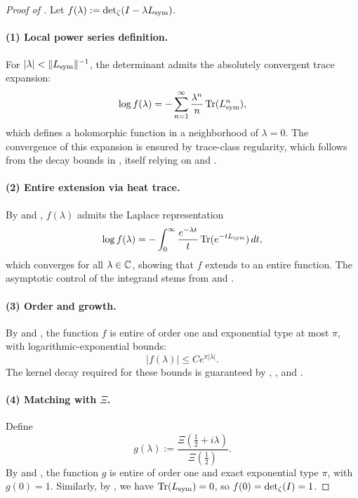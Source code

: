 \begin{proof}[Proof of ]
Let \( f(\lambda) := \det\nolimits_{\zeta}(I - \lambda L_{\mathrm{sym}}) \).

\paragraph{(1) Local power series definition.}
For \( |\lambda| < \|L_{\mathrm{sym}}\|^{-1} \), the determinant admits the absolutely convergent trace expansion:
\[
\log f(\lambda) = - \sum_{n=1}^\infty \frac{\lambda^n}{n} \operatorname{Tr}(L_{\mathrm{sym}}^n),
\]
which defines a holomorphic function in a neighborhood of \( \lambda = 0 \). The convergence of this expansion is ensured by trace-class regularity, which follows from the decay bounds in , itself relying on  and .

\paragraph{(2) Entire extension via heat trace.}
By  and , \( f(\lambda) \) admits the Laplace representation
\[
\log f(\lambda) = - \int_0^\infty \frac{e^{-\lambda t}}{t} \operatorname{Tr}(e^{-t L_{\mathrm{sym}}}) \, dt,
\]
which converges for all \( \lambda \in \mathbb{C} \), showing that \( f \) extends to an entire function. The asymptotic control of the integrand stems from  and .

\paragraph{(3) Order and growth.}
By  and , the function \( f \) is entire of order one and exponential type at most \( \pi \), with logarithmic-exponential bounds:
\[
|f(\lambda)| \le C e^{\pi |\lambda|}.
\]
The kernel decay required for these bounds is guaranteed by , , and .

\paragraph{(4) Matching with \(\Xi\).}
Define
\[
g(\lambda) := \frac{\Xi\left( \tfrac{1}{2} + i\lambda \right)}{\Xi\left( \tfrac{1}{2} \right)}.
\]
By  and , the function \( g \) is entire of order one and exact exponential type \( \pi \), with \( g(0) = 1 \). Similarly, by , we have \( \operatorname{Tr}(L_{\mathrm{sym}}) = 0 \), so \( f(0) = \det\nolimits_{\zeta}(I) = 1 \).


\end{proof}
